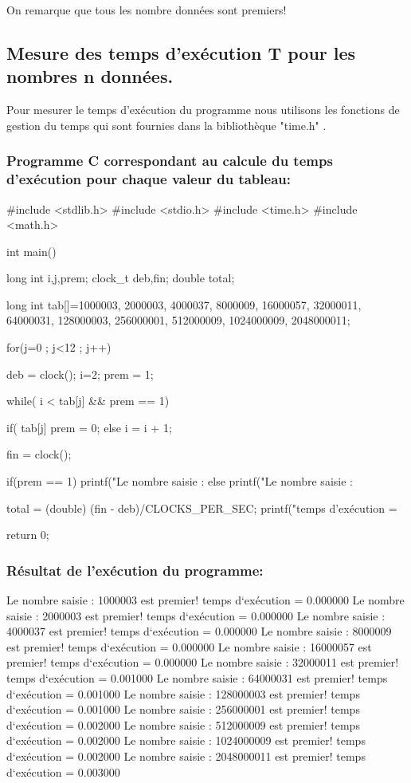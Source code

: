 \documentclass[12pt]{article}
\begin{document}
On remarque que tous les nombre données sont premiers!

\subsection{Mesure des temps d'exécution T pour les nombres n données.}

Pour mesurer le temps d'exécution du programme nous utilisons les fonctions de gestion du temps qui sont fournies dans la bibliothèque "time.h" .

\subsubsection{Programme C correspondant au calcule du temps d'exécution pour chaque valeur du tableau:}
\begin{sql}
#include <stdlib.h>
#include <stdio.h>
#include <time.h>
#include <math.h>

int main()
{
	long int i,j,prem;
	clock_t deb,fin;
	double total;

	long int tab[]={1000003, 2000003, 4000037, 8000009, 16000057, 32000011,	64000031, 128000003, 256000001,	512000009,	1024000009, 2048000011};

for(j=0 ; j<12 ; j++)
{
	deb = clock();
	i=2;
	prem = 1;

	while( i < tab[j] && prem == 1){

		if( tab[j]%
			prem = 0;
		else
			i = i + 1;
	}

	fin = clock();

	if(prem == 1)
    {
        printf("Le nombre saisie : %
    }
	else{
        printf("Le nombre saisie : %
	}

	total = (double) (fin - deb)/CLOCKS_PER_SEC;
	printf("temps d'exécution = %
}
return 0;
}
\end{sql}

\subsubsection{Résultat de l'exécution du programme:}
\begin{sql}
Le nombre saisie : 1000003 est premier!
temps d`exécution = 0.000000
Le nombre saisie : 2000003 est premier!
temps d`exécution = 0.000000
Le nombre saisie : 4000037 est premier!
temps d`exécution = 0.000000
Le nombre saisie : 8000009 est premier!
temps d`exécution = 0.000000
Le nombre saisie : 16000057 est premier!
temps d`exécution = 0.000000
Le nombre saisie : 32000011 est premier!
temps d`exécution = 0.001000
Le nombre saisie : 64000031 est premier!
temps d`exécution = 0.001000
Le nombre saisie : 128000003 est premier!
temps d`exécution = 0.001000
Le nombre saisie : 256000001 est premier!
temps d`exécution = 0.002000
Le nombre saisie : 512000009 est premier!
temps d`exécution = 0.002000
Le nombre saisie : 1024000009 est premier!
temps d`exécution = 0.002000
Le nombre saisie : 2048000011 est premier!
temps d`exécution = 0.003000
\end{sql}
\end{document}

